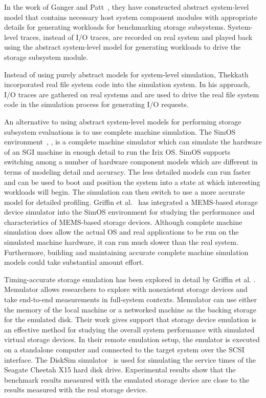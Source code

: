 In the work of Ganger and Patt~\cite{Ganger:1998}, they have constructed abstract system-level model that contains necessary host system component modules with appropriate details for generating workloads for benchmarking storage subsystems. System-level traces, instead of I/O traces, are recorded on real system and played back using the abstract system-level model for generating workloads to drive the storage subsystem module.

Instead of using purely abstract models for system-level simulation, Thekkath~\cite{Thekkath:1994} incorporated real file system code into the simulation system. In his approach, I/O traces are gathered on real systems and are used to drive the real file system code in the simulation process for generating I/O requests.

An alternative to using abstract system-level models for performing storage subsystem evaluations is to use complete machine simulation. The SimOS environment~\cite{Rosenblum:1995}, \cite{Witchel:1996}, \cite{Rosenblum:1997} is a complete machine simulator which can simulate the hardware of an SGI machine in enough detail to run the Irix OS. SimOS supports switching among a number of hardware component models which are different in terms of modeling detail and accuracy. The less detailed models can run faster and can be used to boot and position the system into a state at which interesting workloads will begin. The simulation can then switch to use a more accurate model for detailed profiling. Griffin et al.~\cite{Griffin:2000} has integrated a MEMS-based storage device simulator into the SimOS environment for studying the performance and characteristics of MEMS-based storage devices. Although complete machine simulation does allow the actual OS and real applications to be run on the simulated machine hardware, it can run much slower than the real system. Furthermore, building and maintaining accurate complete machine simulation models could take substantial amount effort.

Timing-accurate storage emulation has been explored in detail by Griffin et al. \cite{Griffin:2002}. Memulator allows researchers to explore with nonexistent storage devices and take end-to-end measurements in full-system contexts. Memulator can use either the memory of the local machine or a networked machine as the backing storage for the emulated disk. Their work gives support that storage device emulation is an effective method for studying the overall system performance with simulated virtual storage devices. In their remote emulation setup, the emulator is executed on a standalone computer and connected to the target system over the SCSI interface. The DiskSim simulator~\cite{Bucy:2008} is used for simulating the service times of the Seagate Cheetah X15 hard disk drive. Experimental results show that the benchmark results measured with the emulated storage device are close to the results measured with the real storage device.

